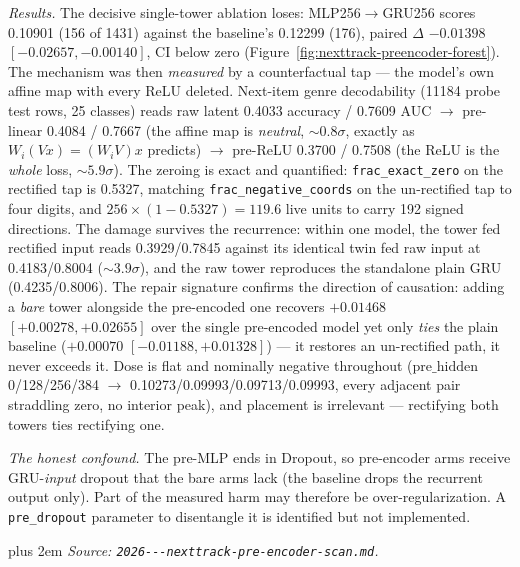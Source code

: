 \documentclass[11pt]{article}
\begin{document}
\emph{Results.} The decisive single-tower ablation loses: MLP256$\to$GRU256
scores \num{0.10901} (\num{156} of \num{1431}) against the baseline's
\num{0.12299} (\num{176}), paired $\Delta$ $-\num{0.01398}$
$[-\num{0.02657},-\num{0.00140}]$, CI below zero
(Figure~\ref{fig:nexttrack-preencoder-forest}). The mechanism was then
\emph{measured} by a counterfactual tap --- the model's own affine map with every
ReLU deleted. Next-item genre decodability (\num{11184} probe test rows, \num{25}
classes) reads raw latent \num{0.4033} accuracy / \num{0.7609} AUC $\to$
pre-linear \num{0.4084} / \num{0.7667} (the affine map is \emph{neutral},
${\sim}\num{0.8}\sigma$, exactly as $W_i(Vx)=(W_iV)x$ predicts) $\to$
pre-ReLU \num{0.3700} / \num{0.7508} (the ReLU is the \emph{whole} loss,
${\sim}\num{5.9}\sigma$). The zeroing is exact and quantified:
\texttt{frac\_exact\_zero} on the rectified tap is \num{0.5327}, matching
\texttt{frac\_negative\_coords} on the un-rectified tap to four digits, and
$256\times(1-\num{0.5327})=\num{119.6}$ live units to carry \num{192} signed
directions. The damage survives the recurrence: within one model, the tower fed
rectified input reads \num{0.3929}/\num{0.7845} against its identical twin fed
raw input at \num{0.4183}/\num{0.8004} (${\sim}\num{3.9}\sigma$), and the raw
tower reproduces the standalone plain GRU (\num{0.4235}/\num{0.8006}). The
repair signature confirms the direction of causation: adding a \emph{bare} tower
alongside the pre-encoded one recovers $+\num{0.01468}$
$[+\num{0.00278},+\num{0.02655}]$ over the single pre-encoded model yet only
\emph{ties} the plain baseline ($+\num{0.00070}$
$[-\num{0.01188},+\num{0.01328}]$) --- it restores an un-rectified path, it never
exceeds it. Dose is flat and nominally negative throughout
($\text{pre\_hidden}$ \num{0}/\num{128}/\num{256}/\num{384} $\to$
\num{0.10273}/\num{0.09993}/\num{0.09713}/\num{0.09993}, every adjacent pair
straddling zero, no interior peak), and placement is irrelevant --- rectifying
both towers ties rectifying one.

\emph{The honest confound.} The pre-MLP ends in Dropout, so pre-encoder arms
receive GRU-\emph{input} dropout that the bare arms lack (the baseline drops the
recurrent output only). Part of the measured harm may therefore be
over-regularization. A \texttt{pre\_dropout} parameter to disentangle it is
identified but not implemented.

{\rightskip=0pt plus 2em \emph{Source: \texttt{2026---\allowbreak nexttrack-\allowbreak pre-\allowbreak encoder-\allowbreak scan.md}.}\par}
\end{document}
